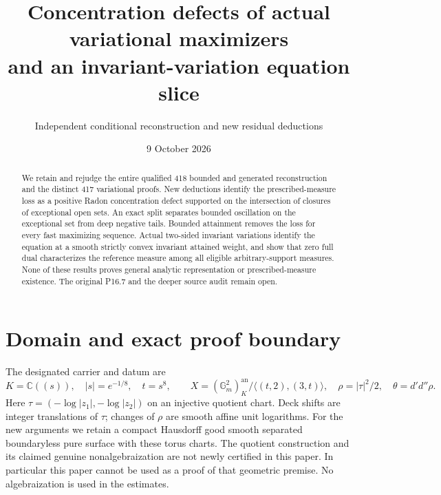 \documentclass[11pt]{article}
\title{Concentration defects of actual variational maximizers\\and an invariant-variation equation slice}
\author{Independent conditional reconstruction and new residual deductions}
\date{9 October 2026}
\newcommand{\DD}{d'd''}
\begin{document}
\maketitle
\begin{abstract}
We retain and rejudge the entire qualified 418 bounded and generated
reconstruction and the distinct 417 variational proofs. New deductions
identify the prescribed-measure loss as a positive Radon concentration
defect supported on the intersection of closures of exceptional open
sets. An exact split separates bounded oscillation on the exceptional
set from deep negative tails. Bounded attainment removes the loss for
every fast maximizing sequence. Actual two-sided invariant variations
identify the equation at a smooth strictly convex invariant attained
weight, and show that zero full dual characterizes the reference
measure among all eligible arbitrary-support measures. None of these
results proves general analytic representation or prescribed-measure
existence. The original P16.7 and the deeper source audit remain open.
\end{abstract}

\section{Domain and exact proof boundary}
The designated carrier and datum are
\[
 K=\mathbb C((s)),\quad |s|=e^{-1/8},\quad t=s^8,\qquad
 X=(\mathbb G_m^2)^{\mathrm{an}}_K/\langle(t,2),(3,t)\rangle,
 \quad \rho=|\tau|^2/2,\quad\theta=\DD\rho.
\]
Here $\tau=(-\log|z_1|,-\log|z_2|)$ on an injective quotient
chart. Deck shifts are integer translations of $\tau$; changes of
$\rho$ are smooth affine unit logarithms. For the new arguments we
retain a compact Hausdorff good smooth separated boundaryless pure
surface with these torus charts. The quotient construction and its
claimed genuine nonalgebraization are not newly certified in this paper.
In particular this paper cannot be used as a proof of that geometric
premise. No algebraization is used in the estimates.
\end{document}
